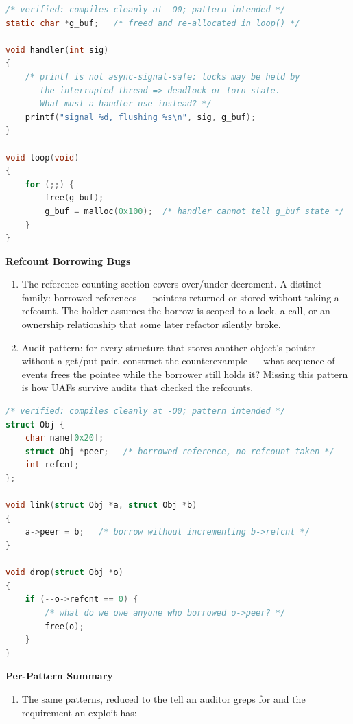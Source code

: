 \documentclass[12pt]{Training}
\begin{document}
\begin{sectionbox}
\begin{lstlisting}[language=C, caption={Async-Signal-Unsafe Handler}]
/* verified: compiles cleanly at -O0; pattern intended */
static char *g_buf;   /* freed and re-allocated in loop() */

void handler(int sig)
{
    /* printf is not async-signal-safe: locks may be held by
       the interrupted thread => deadlock or torn state.
       What must a handler use instead? */
    printf("signal %d, flushing %s\n", sig, g_buf);
}

void loop(void)
{
    for (;;) {
        free(g_buf);
        g_buf = malloc(0x100);  /* handler cannot tell g_buf state */
    }
}
\end{lstlisting}
\end{sectionbox}

\textbf{Refcount Borrowing Bugs}
\begin{enumerate}
    \item The reference counting section covers over/under-decrement. A distinct family: borrowed references --- pointers returned or stored without taking a refcount. The holder assumes the borrow is scoped to a lock, a call, or an ownership relationship that some later refactor silently broke.
    \item Audit pattern: for every structure that stores another object's pointer without a get/put pair, construct the counterexample --- what sequence of events frees the pointee while the borrower still holds it? Missing this pattern is how UAFs survive audits that checked the refcounts.
\end{enumerate}

\begin{sectionbox}
\begin{lstlisting}[language=C, caption={Borrowed Reference}]
/* verified: compiles cleanly at -O0; pattern intended */
struct Obj {
    char name[0x20];
    struct Obj *peer;   /* borrowed reference, no refcount taken */
    int refcnt;
};

void link(struct Obj *a, struct Obj *b)
{
    a->peer = b;   /* borrow without incrementing b->refcnt */
}

void drop(struct Obj *o)
{
    if (--o->refcnt == 0) {
        /* what do we owe anyone who borrowed o->peer? */
        free(o);
    }
}
\end{lstlisting}
\end{sectionbox}

\textbf{Per-Pattern Summary}
\begin{enumerate}
    \item The same patterns, reduced to the tell an auditor greps for and the requirement an exploit has:
\end{enumerate}
\end{document}
